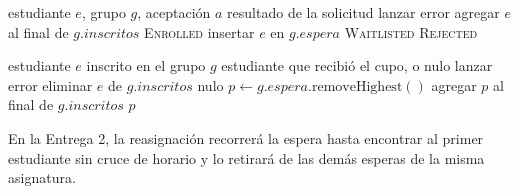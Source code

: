 \documentclass[conference]{IEEEtran}
\begin{document}
\begin{algorithm}[htbp]
\caption{Solicitar un grupo (\texttt{CourseGroup.request})}
\label{alg:request}
\begin{algorithmic}[1]
\Require estudiante $e$, grupo $g$, aceptación $a$
\Ensure resultado de la solicitud
 
    \State lanzar error
\EndIf
{}
    \State agregar $e$ al final de $g.\mathit{inscritos}$ 
    \State \Return \textsc{Enrolled}
    \State insertar $e$ en $g.\mathit{espera}$ 
    \State \Return \textsc{Waitlisted}
\Else
    \State \Return \textsc{Rejected}
\EndIf
\end{algorithmic}
\end{algorithm}

\begin{algorithm}[htbp]
\caption{Cancelar y reasignar un cupo (\texttt{CourseGroup.cancel})}
\label{alg:cancel}
\begin{algorithmic}[1]
\Require estudiante $e$ inscrito en el grupo $g$
\Ensure estudiante que recibió el cupo, o nulo
    \State lanzar error
\EndIf
\State eliminar $e$ de $g.\mathit{inscritos}$ 
    \State \Return nulo
\EndIf
\State $p \gets g.\mathit{espera}.\mathrm{removeHighest}()$ 
\State agregar $p$ al final de $g.\mathit{inscritos}$ 
\State \Return $p$
\end{algorithmic}
\end{algorithm}

En la Entrega 2, la reasignación recorrerá la espera hasta encontrar al primer estudiante sin cruce de horario y lo retirará de las demás esperas de la misma asignatura.
\end{document}
